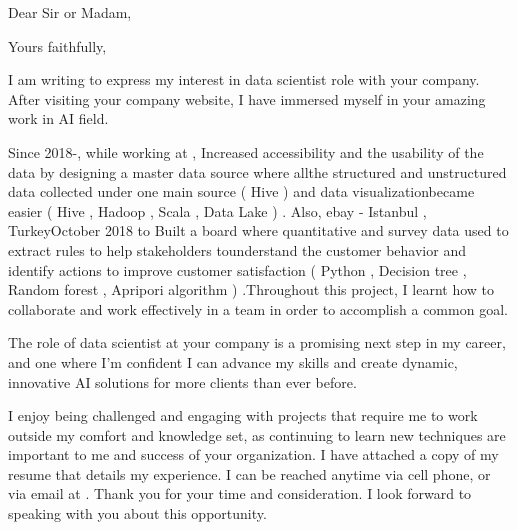 \documentclass[11pt,a4paper,sans]{moderncv}        %
\begin{document}
\recipient{\quad}{\quad}
\date{March 06 2020}
\opening{Dear Sir or Madam,}
\closing{Yours faithfully,}
\makelettertitle


I am writing to express my interest in data scientist role with your company. After visiting your company website, I have immersed myself in your amazing work in AI field.





Since 2018-, while working at , Increased accessibility and the usability of the data by designing a master data source where allthe structured and unstructured data collected under one main source ( Hive ) and data visualizationbecame easier ( Hive , Hadoop , Scala , Data Lake ) . Also, ebay - Istanbul , TurkeyOctober 2018 to Built a board where quantitative and survey data used to extract rules to help stakeholders tounderstand the customer behavior and identify actions to improve customer satisfaction ( Python , Decision tree , Random forest , Apripori algorithm ) .Throughout this project, I learnt how to collaborate and work effectively in a team in order to accomplish a common goal.


The role of data scientist at your company is a promising next step in my career, and one where I’m confident I can advance my skills and create dynamic, innovative AI solutions for more clients than ever before.

I enjoy being challenged and engaging with projects that require me to work outside my comfort and knowledge set, as continuing to learn new techniques are important to me and success of your organization.
I have attached a copy of my resume that details my experience. I can be reached anytime via cell phone,  or via email at .
Thank you for your time and consideration. I look forward to speaking with you about this opportunity.


\makeletterclosing
\end{document}
